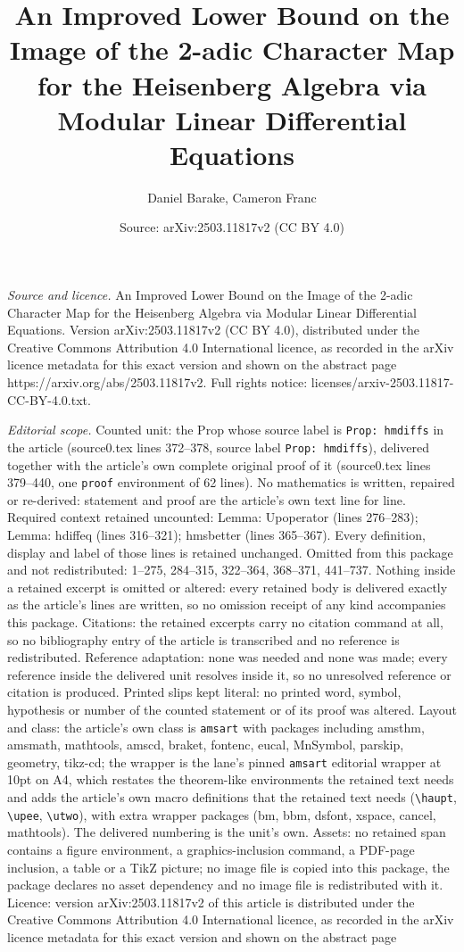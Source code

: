 \documentclass[10pt,a4paper]{amsart}
\title[An Improved Lower Bound on the Image of the 2-adic Character]{An Improved Lower Bound on the Image of the 2-adic Character Map for the Heisenberg Algebra via Modular Linear Differential Equations}
\author{Daniel Barake, Cameron Franc}
\date{Source: arXiv:2503.11817v2 (CC BY 4.0)}
\begin{document}
\maketitle

\noindent\emph{Source and licence.} An Improved Lower Bound on the Image of the 2-adic Character Map for the Heisenberg Algebra via Modular Linear Differential Equations. Version arXiv:2503.11817v2 (CC BY 4.0), distributed under the Creative Commons Attribution 4.0 International licence, as recorded in the arXiv licence metadata for this exact version and shown on the abstract page https://arxiv.org/abs/2503.11817v2. Full rights notice: licenses/arxiv-2503.11817-CC-BY-4.0.txt.\par\smallskip

\noindent\textit{Editorial scope.} Counted unit: the Prop whose source label is \texttt{Prop: hmdiffs} in the article (source0.tex lines 372--378, source label \texttt{Prop: hmdiffs}), delivered together with the article's own complete original proof of it (source0.tex lines 379--440, one \texttt{proof} environment of 62 lines). No mathematics is written, repaired or re-derived: statement and proof are the article's own text line for line. Required context retained uncounted: Lemma: Upoperator (lines 276--283); Lemma: hdiffeq (lines 316--321); hmsbetter (lines 365--367). Every definition, display and label of those lines is retained unchanged. Omitted from this package and not redistributed: 1--275, 284--315, 322--364, 368--371, 441--737. Nothing inside a retained excerpt is omitted or altered: every retained body is delivered exactly as the article's lines are written, so no omission receipt of any kind accompanies this package. Citations: the retained excerpts carry no citation command at all, so no bibliography entry of the article is transcribed and no reference is redistributed. Reference adaptation: none was needed and none was made; every reference inside the delivered unit resolves inside it, so no unresolved reference or citation is produced. Printed slips kept literal: no printed word, symbol, hypothesis or number of the counted statement or of its proof was altered. Layout and class: the article's own class is \texttt{amsart} with packages including amsthm, amsmath, mathtools, amscd, braket, fontenc, eucal, MnSymbol, parskip, geometry, tikz-cd; the wrapper is the lane's pinned \texttt{amsart} editorial wrapper at 10pt on A4, which restates the theorem-like environments the retained text needs and adds the article's own macro definitions that the retained text needs (\texttt{\textbackslash haupt}, \texttt{\textbackslash upee}, \texttt{\textbackslash utwo}), with extra wrapper packages (bm, bbm, dsfont, xspace, cancel, mathtools). The delivered numbering is the unit's own. Assets: no retained span contains a figure environment, a graphics-inclusion command, a PDF-page inclusion, a table or a TikZ picture; no image file is copied into this package, the package declares no asset dependency and no image file is redistributed with it. Licence: version arXiv:2503.11817v2 of this article is distributed under the Creative Commons Attribution 4.0 International licence, as recorded in the arXiv licence metadata for this exact version and shown on the abstract page 
\end{document}
